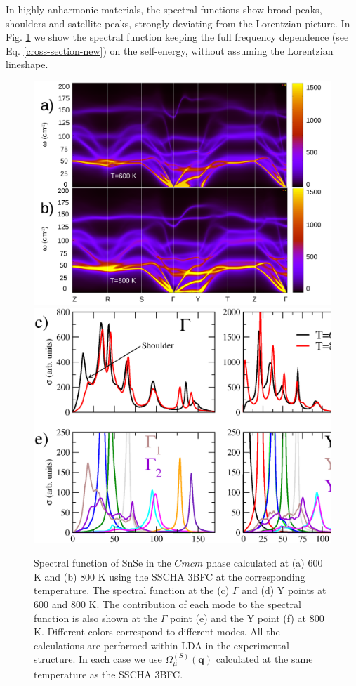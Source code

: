 In highly anharmonic materials\cite{ribeiro2018strong,li2014phonon,bianco2018high,delaire2011giant,paulatto2015first}, the spectral functions show broad peaks, shoulders and satellite peaks, strongly deviating from the Lorentzian 
picture. In Fig. \ref{spectral-snse} we show the spectral function keeping the full frequency dependence (see Eq. \ref{cross-section-new}) on the self-energy, without assuming the Lorentzian lineshape.
\begin{figure}[h]
\begin{center}
\includegraphics[width=0.80\linewidth]{Figures/full-ins-snse.pdf}
\includegraphics[width=0.80\linewidth]{Figures/ins-snse.eps}
	\caption[Nonperturbative spectral function in SnSe.]{Spectral function of SnSe in the $Cmcm$ phase calculated 
	at (a) $600$ K and (b) $800$ K using the SSCHA 3BFC at the corresponding temperature. The spectral function 
	at the (c) $\Gamma$ and (d) Y points at $600$ and $800$ K. The contribution of each mode to the spectral 
	function is also shown at the $\Gamma$ point (e) and the Y point (f) at $800$ K. Different colors correspond 
	to different modes. All the calculations are performed within LDA in the experimental structure. In each case 
	we use $\Omega^{(S)}_{\mu}(\mathbf{q})$ calculated at the same temperature as the SSCHA 3BFC.}
\label{spectral-snse}
\end{center}
\end{figure}

